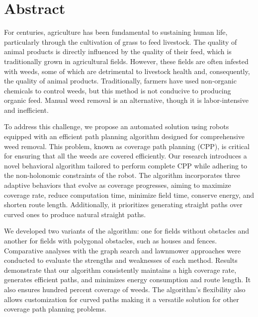
\chapter*{Abstract} 

For centuries, agriculture has been fundamental to sustaining human life, particularly through the cultivation of grass to feed livestock. The quality of animal products is directly influenced by the quality of their feed, which is traditionally grown in agricultural fields. However, these fields are often infested with weeds, some of which are detrimental to livestock health and, consequently, the quality of animal products. Traditionally, farmers have used non-organic chemicals to control weeds, but this method is not conducive to producing organic feed. Manual weed removal is an alternative, though it is labor-intensive and inefficient.

To address this challenge, we propose an automated solution using robots equipped with an efficient path planning algorithm designed for comprehensive weed removal. This problem, known as coverage path planning (CPP), is critical for ensuring that all the weeds are covered efficiently. Our research introduces a novel behavioral algorithm tailored to perform complete CPP while adhering to the non-holonomic constraints of the robot. The algorithm incorporates three adaptive behaviors that evolve as coverage progresses, aiming to maximize coverage rate, reduce computation time, minimize field time, conserve energy, and shorten route length. Additionally, it prioritizes generating straight paths over curved ones to produce natural straight paths.

We developed two variants of the algorithm: one for fields without obstacles and another for fields with polygonal obstacles, such as houses and fences. Comparative analyses with the graph search and lawnmower approaches were conducted to evaluate the strengths and weaknesses of each method. Results demonstrate that our algorithm consistently maintains a high coverage rate, generates efficient paths, and minimizes energy consumption and route length. It also ensures hundred percent coverage of weeds. The algorithm's flexibility also allows customization for curved paths making it a versatile solution for other coverage path planning problems.


